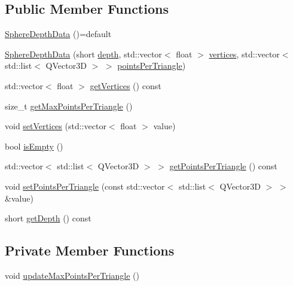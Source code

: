 \subsection*{Public Member Functions}
\begin{DoxyCompactItemize}
\item 
\hyperlink{class_sphere_depth_data_adf3b418ea38626e3d768240d257504ea}{Sphere\+Depth\+Data} ()=default
\item 
\hyperlink{class_sphere_depth_data_a746de4be5c4ff2bdcbdc1517aa88a4d9}{Sphere\+Depth\+Data} (short \hyperlink{class_sphere_depth_data_a32dc63866d12b3102942e14bb28238ff}{depth}, std\+::vector$<$ float $>$ \hyperlink{class_sphere_depth_data_a139a9131aa15308e012fc8190de2011d}{vertices}, std\+::vector$<$ std\+::list$<$ Q\+Vector3D $>$ $>$ \hyperlink{class_sphere_depth_data_a9decfacc00300c153ecff80288b7413f}{points\+Per\+Triangle})
\item 
std\+::vector$<$ float $>$ \hyperlink{class_sphere_depth_data_adab658de163c515ec9a41a70300a0af9}{get\+Vertices} () const
\item 
size\+\_\+t \hyperlink{class_sphere_depth_data_ad151dd50ed037d91aecec6b285a3e342}{get\+Max\+Points\+Per\+Triangle} ()
\item 
void \hyperlink{class_sphere_depth_data_a95e070bea3d8ec4a0449044e4616208f}{set\+Vertices} (std\+::vector$<$ float $>$ value)
\item 
bool \hyperlink{class_sphere_depth_data_a4dbc8b7d0be93277f328a2e241ea336f}{is\+Empty} ()
\item 
std\+::vector$<$ std\+::list$<$ Q\+Vector3D $>$ $>$ \hyperlink{class_sphere_depth_data_af42bd1ede7948a735367755a61148adc}{get\+Points\+Per\+Triangle} () const
\item 
void \hyperlink{class_sphere_depth_data_ac0d61e109f98ac7c5b7f4ea7381bc963}{set\+Points\+Per\+Triangle} (const std\+::vector$<$ std\+::list$<$ Q\+Vector3D $>$ $>$ \&value)
\item 
short \hyperlink{class_sphere_depth_data_a925a7e0a5486b49151d823471ebe7fe6}{get\+Depth} () const
\end{DoxyCompactItemize}
\subsection*{Private Member Functions}
\begin{DoxyCompactItemize}
\item 
void \hyperlink{class_sphere_depth_data_a4cf92f63341fd72e6659dcd1501eb2ac}{update\+Max\+Points\+Per\+Triangle} ()
\end{DoxyCompactItemize}
